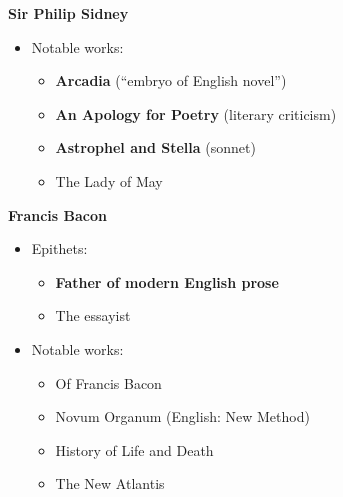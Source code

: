 \documentclass[
  12pt,
    progressbar=frametitle]{beamer}
\providecommand{\tightlist}{%
  \setlength{\itemsep}{0pt}\setlength{\parskip}{0pt}}
\begin{document}
\begin{frame}[allowframebreaks]
\large\textbf{Sir Philip Sidney}\normalsize\vspace{-3mm}

\begin{itemize}
\tightlist
\item
  Notable works:

  \begin{itemize}
  \tightlist
  \item
    \textbf{Arcadia} (``embryo of English novel'')
  \item
    \textbf{An Apology for Poetry} (literary criticism)
  \item
    \textbf{Astrophel and Stella} (sonnet)
  \item
    The Lady of May
  \end{itemize}
\end{itemize}

\large\textbf{Francis Bacon}\normalsize\vspace{-3mm}

\begin{itemize}
\tightlist
\item
  Epithets:

  \begin{itemize}
  \tightlist
  \item
    \textbf{Father of modern English prose}
  \item
    The essayist
  \end{itemize}
\item
  Notable works:

  \begin{itemize}
  \tightlist
  \item
    \footnotesize{}\;\normalsize Of
    \footnotesize{}\;\normalsize Francis
    Bacon \footnotesize{}\;\normalsize
  \item
    Novum Organum (English: New Method)
  \item
    History of Life and Death
  \item
    The New Atlantis
  \end{itemize}
\end{itemize}
\end{frame}
\end{document}
